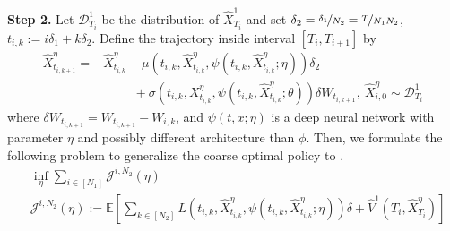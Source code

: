 \documentclass{article}
\numberwithin{equation}{section}
\begin{document}
\noindent\textbf{Step 2.} Let $\mathcal{D}^1_{T_{i}}$ be the  distribution of $\hat{X}^1_{T_{i}}$ and set  $\delta_2=\nicefrac{\delta_1}{N_2}=\nicefrac{T}{N_1N_2}$, $t_{i,k}:=i\delta_1+k\delta_2$. Define the trajectory inside interval $[T_i,T_{i+1}]$ by
\begin{align}
\hat{X}^\eta_{t_{i,k+1}}=&\hat{X}^\eta_{t_{i,k}}+\mu({t_{i,k}},\hat{X}_{t_{i,k}}^\eta,\psi(t_{i,k},\hat{X}^\eta_{t_{i,k}};\eta))\delta_2\nonumber\\
   &\hspace{1cm} 
+\sigma({t_{i,k}},X_{t_{i,k}}^\eta,\psi(t_{i,k},\hat{X}^\eta_{t_{i,k}};\theta))\delta W_{{t_{i,k+1}}}, ~\hat{X}^\eta_{i,0}\sim\mathcal{D}^1_{T_i}\label{X^eta}
\end{align}
where
$\delta W_{{t_{i,k+1}}}=W_{t_{i,k+1}}-W_{i,k}$, and $\psi(t,x;\eta)$ is a deep neural network with parameter $\eta$ and possibly different architecture than $\phi$.
Then, we formulate the following problem to generalize the coarse optimal policy to .  
\begin{equation}\label{prob:fine}
\begin{split}
    &\inf_{\eta}\sum_{i\in[N_1]}\mathcal{J}^{i,N_2}(\eta)\\
    &\mathcal{J}^{i,N_2}(\eta):=\mathbb{E}\left[\sum_{k\in[N_2]}L(t_{i,k},\hat{X}^\eta_{t_{i,k}},\psi(t_{i,k},\hat{X}^\eta_{t_{i,k}};\eta))\delta + \hat{V}^1(T_i,\hat{X}^\eta_{T_{i}})\right]
    \end{split}
\end{equation}
\end{document}
